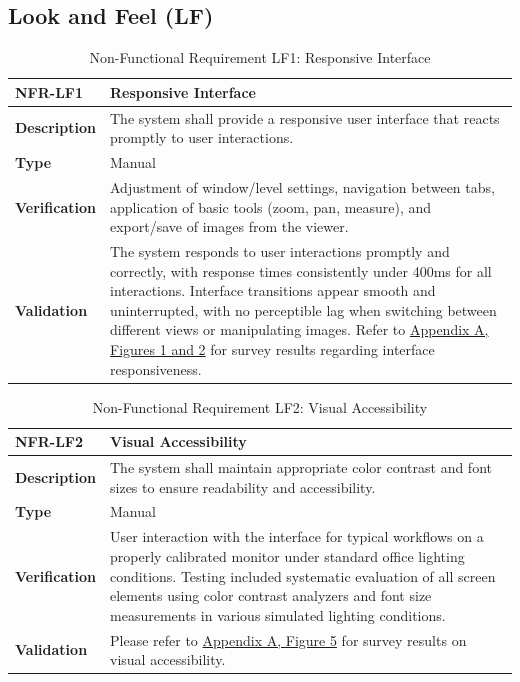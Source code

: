 \documentclass[12pt, titlepage]{article}
\begin{document}
\subsection{Look and Feel (LF)}
\begin{table}[H]
\centering
{}
\begin{tabular}{|p{3.5cm}|p{11.5cm}|}
\hline
\rowcolor{gray!30}
\textbf{NFR-LF1} & \textbf{Responsive Interface} \\
\hline
\textbf{Description} & The system shall provide a responsive user interface that reacts promptly to user interactions.\\
\hline
\textbf{Type} & Manual \\
\hline
\textbf{Verification} & Adjustment of window/level settings, navigation between tabs, application of basic tools (zoom, pan, measure), and export/save of images from the viewer. \\
\hline
\textbf{Validation} & The system responds to user interactions promptly and correctly, with response times consistently under 400ms for all interactions. Interface transitions appear smooth and uninterrupted, with no perceptible lag when switching between different views or manipulating images. Refer to \hyperref[appendix:A]{Appendix A, Figures 1 and 2} for survey results regarding interface responsiveness. \\
\hline
\end{tabular}
\caption{Non-Functional Requirement LF1: Responsive Interface}
\end{table}

\begin{table}[H]
\centering
{}
\begin{tabular}{|p{3.5cm}|p{11.5cm}|}
\hline
\rowcolor{gray!30}
\textbf{NFR-LF2} & \textbf{Visual Accessibility} \\
\hline
\textbf{Description} & The system shall maintain appropriate color contrast and font sizes to ensure readability and accessibility.\\
\hline
\textbf{Type} & Manual \\
\hline
\textbf{Verification} & User interaction with the interface for typical workflows on a properly calibrated monitor under standard office lighting conditions. Testing included systematic evaluation of all screen elements using color contrast analyzers and font size measurements in various simulated lighting conditions. \\
\hline
\textbf{Validation} & Please refer to \hyperref[appendix:A]{Appendix A, Figure 5} for survey results on visual accessibility. \\
\hline
\end{tabular}
\caption{Non-Functional Requirement LF2: Visual Accessibility}
\end{table}
\end{document}
